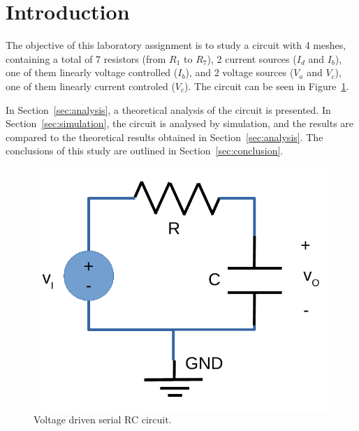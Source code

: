 \section{Introduction}
\label{sec:introduction}

The objective of this laboratory assignment is to study a circuit with 4 meshes, containing a total of 7 resistors (from $R_1$ to $R_7$), 2 current sources ($I_d$ and $I_b$), one of them linearly voltage controlled ($I_b$), and 2 voltage sources ($V_a$ and $V_c$), one of them linearly current controled ($V_c$). The circuit can be seen in Figure~\ref{fig:rc}.

In Section~\ref{sec:analysis}, a theoretical analysis of the circuit is
presented. In Section~\ref{sec:simulation}, the circuit is analysed by
simulation, and the results are compared to the theoretical results obtained in
Section~\ref{sec:analysis}. The conclusions of this study are outlined in
Section~\ref{sec:conclusion}.

\begin{figure}[h] \centering
\includegraphics[width=0.4\linewidth]{rc.pdf}
\caption{Voltage driven serial RC circuit.}
\label{fig:rc}
\end{figure}

